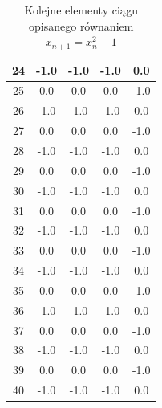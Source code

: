 \documentclass{article}
\begin{document}
\begin{table}[h!]
\begin{tabular}{ |c|c|c|c|c| }
    \hline
    24 & -1.0 & -1.0 & -1.0 & 0.0 \\
    \hline
    25 & 0.0 & 0.0 & 0.0 & -1.0 \\
    \hline
    26 & -1.0 & -1.0 & -1.0 & 0.0 \\
    \hline
    27 & 0.0 & 0.0 & 0.0 & -1.0 \\
    \hline
    28 & -1.0 & -1.0 & -1.0 & 0.0 \\
    \hline
    29 & 0.0 & 0.0 & 0.0 & -1.0 \\
    \hline
    30 & -1.0 & -1.0 & -1.0 & 0.0 \\
    \hline
    31 & 0.0 & 0.0 & 0.0 & -1.0 \\
    \hline
    32 & -1.0 & -1.0 & -1.0 & 0.0 \\
    \hline
    33 & 0.0 & 0.0 & 0.0 & -1.0 \\
    \hline
    34 & -1.0 & -1.0 & -1.0 & 0.0 \\
    \hline
    35 & 0.0 & 0.0 & 0.0 & -1.0 \\
    \hline
    36 & -1.0 & -1.0 & -1.0 & 0.0 \\
    \hline
    37 & 0.0 & 0.0 & 0.0 & -1.0 \\
    \hline
    38 & -1.0 & -1.0 & -1.0 & 0.0 \\
    \hline
    39 & 0.0 & 0.0 & 0.0 & -1.0 \\
    \hline
    40 & -1.0 & -1.0 & -1.0 & 0.0 \\
    \hline
    \end{tabular}
    \caption{Kolejne elementy ciągu opisanego równaniem $x_{n+1} = x_n^2 - 1$}
\end{table}
\end{document}
